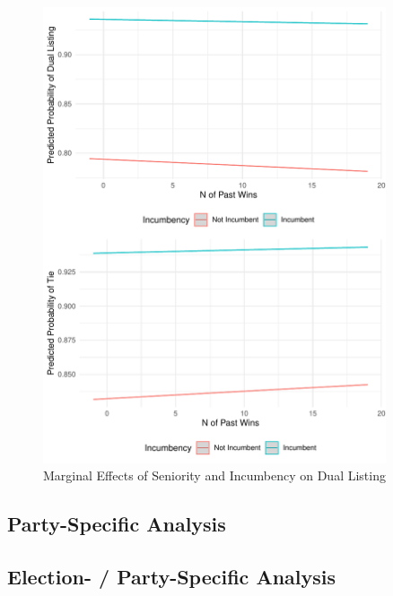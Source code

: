 \documentclass[a4paper, 11pt]{article}
\begin{document}
\begin{figure}[!htbp]
	\includegraphics[width = 0.9\textwidth]{../figure/paper/marginal_effects_dual_tie.pdf}
	\caption{Marginal Effects of Seniority and Incumbency on Dual Listing}
	\label{fig:marginal_dual}
\end{figure}


\subsection{Party-Specific Analysis}






\subsection{Election- / Party-Specific Analysis}



\end{document}
